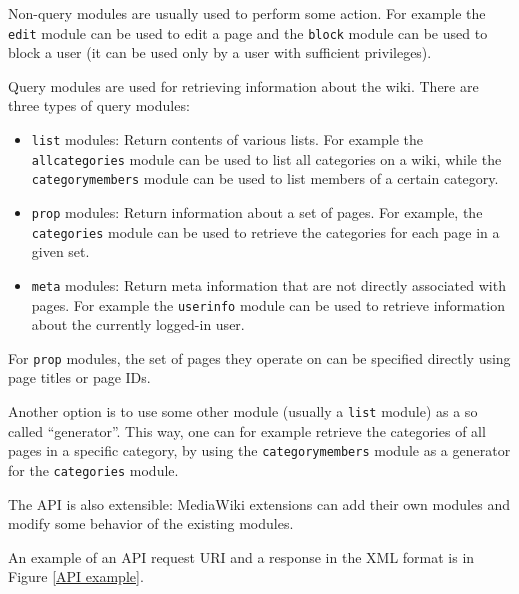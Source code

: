 Non-query modules are usually used to perform some action.
For example the \texttt{edit} module can be used to edit a page
and the \texttt{block} module can be used to block a user (it can be used only by a user with sufficient privileges).

Query modules are used for retrieving information about the wiki. There are three types of query modules:

\begin{itemize}
\item \texttt{list} modules: Return contents of various lists.
For example the \texttt{allcategories} module can be used to list all categories on a wiki,
while the \texttt{categorymembers} module can be used to list members of a certain category.
\item \texttt{prop} modules: Return information about a set of pages.
For example, the \texttt{categories} module can be used to retrieve the categories for each page in a given set.
\item \texttt{meta} modules: Return meta information that are not directly associated with pages.
For example the \texttt{userinfo} module can be used to retrieve information about the currently logged-in user.
\end{itemize}

For \texttt{prop} modules, the set of pages they operate on can be specified directly using page titles or page IDs.

Another option is to use some other module (usually a \texttt{list} module) as a so called ``generator''.
This way, one can for example retrieve the categories of all pages in a specific category,
by using the \texttt{categorymembers} module as a generator for the \texttt{categories} module.

The API is also extensible: MediaWiki extensions can add their own modules and modify some behavior of the existing modules.

An example of an API request URI and a response in the XML format is in Figure \ref{API example}.

